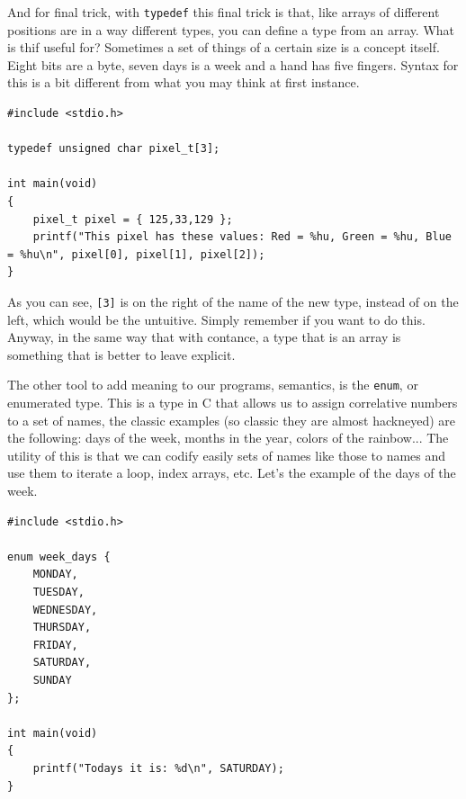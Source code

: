 \documentclass[a4paper]{article}
\begin{document}
And for final trick, with \verb!typedef! this final trick is that, like arrays
of different positions are in a way different types, you can define a type from
an array. What is thif useful for? Sometimes a set of things of a certain size
is a concept itself. Eight bits are a byte, seven days is a week and a hand has
five fingers. Syntax for this is a bit different from what you may think at
first instance.

\noindent
\begin{minipage}[H]{\linewidth}
\mbox{}
\begin{lstlisting}[style=C,
caption={Definición de un tipo personalizado a partir de un array},
label={lst:typedefArrayType}]
#include <stdio.h>

typedef unsigned char pixel_t[3];

int main(void)
{
    pixel_t pixel = { 125,33,129 };
    printf("This pixel has these values: Red = %hu, Green = %hu, Blue = %hu\n", pixel[0], pixel[1], pixel[2]);
}
\end{lstlisting}
\end{minipage}

As you can see, \verb![3]! is on the right of the name of the new type, instead
of on the left, which would be the untuitive. Simply remember if you want to do
this. Anyway, in the same way that with contance, a type that is an array is
something that is better to leave explicit.

The other tool to add meaning to our programs, semantics, is the \verb!enum!, or
enumerated type. This is a type in C that allows us to assign correlative
numbers to a set of names, the classic examples (so classic they are almost
hackneyed) are the following: days of the week, months in the year, colors of
the rainbow... The utility of this is that we can codify easily sets of names
like those to names and use them to iterate a loop, index arrays, etc. Let's the
example of the days of the week.

\noindent
\begin{minipage}[H]{\linewidth}
\mbox{}
\begin{lstlisting}[style=C,
caption={Basic example of enumerated type},
label={lst:BasicEnum}]
#include <stdio.h>

enum week_days {
    MONDAY,
    TUESDAY,
    WEDNESDAY,
    THURSDAY,
    FRIDAY,
    SATURDAY,
    SUNDAY
};

int main(void)
{
    printf("Todays it is: %d\n", SATURDAY);
}
\end{lstlisting}
\end{minipage}
\end{document}
